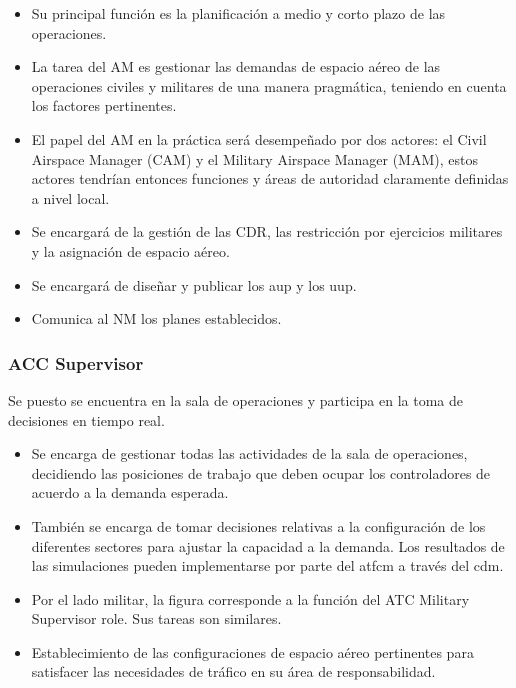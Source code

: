 \begin{itemize}
    \item Su principal función es la planificación a medio y corto plazo de las operaciones.
    
    \item La tarea del AM es gestionar las demandas de espacio aéreo de las operaciones civiles y militares de una manera pragmática, teniendo en cuenta los factores pertinentes.
    
    \item El papel del AM en la práctica será desempeñado por dos actores: el Civil Airspace Manager  (CAM) y el Military  Airspace  Manager (MAM), estos actores tendrían entonces funciones y áreas de autoridad claramente definidas a nivel local.
    
    \item Se encargará de la gestión de las CDR, las restricción por ejercicios militares y la asignación de espacio aéreo. 
    
    \item Se encargará de diseñar y publicar los \acrfull{aup} y los \acrfull{uup}.
    
    \item Comunica al NM los planes establecidos.
\end{itemize}

\subsubsection{ACC Supervisor}    

Se puesto se encuentra en la sala de operaciones y participa en la toma de decisiones en tiempo real.

\begin{itemize}
    \item Se encarga de gestionar todas las actividades de la sala de operaciones, decidiendo las posiciones de trabajo que deben ocupar los controladores de acuerdo a la demanda esperada.
    
    \item También se encarga de tomar decisiones relativas a la configuración de los diferentes sectores para ajustar la capacidad a la demanda. Los resultados de las simulaciones pueden implementarse por parte del \acrfull{atfcm} a través del \acrfull{cdm}.
    
    \item Por el lado militar, la figura corresponde a la función del ATC Military Supervisor role. Sus tareas son similares.
    
    \item Establecimiento de las configuraciones de espacio aéreo pertinentes para satisfacer las necesidades de tráfico en su área de responsabilidad.
\end{itemize}
 
